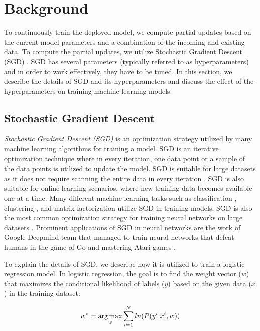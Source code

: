 \section{Background} \label{background}
To continuously train the deployed model, we compute partial updates based on the current model parameters and a combination of the incoming and existing data.
To compute the partial updates, we utilize Stochastic Gradient Descent (SGD) \cite{zhang2004solving}.
SGD has several parameters (typically referred to as hyperparameters) and in order to work effectively, they have to be tuned.
In this section, we describe the details of SGD and its hyperparameters and discuss the effect of the hyperparameters on training machine learning models.

\subsection{Stochastic Gradient Descent} \label{sgd}
\textit{Stochastic Gradient Descent (SGD)} is an optimization strategy utilized by many machine learning algorithms for training a model.
SGD is an iterative optimization technique where in every iteration, one data point or a sample of the data points is utilized to update the model.
SGD is suitable for large datasets as it does not require scanning the entire data in every iteration \cite{bottou2010large}.
SGD is also suitable for online learning scenarios, where new training data becomes available one at a time.
Many different machine learning tasks such as classification \cite{zhang2004solving, macmahan2013}, clustering \cite{bottou1995convergence}, and matrix factorization \cite{koren2009matrix,  funk2006netflix} utilize SGD in training models.
SGD is also the most common optimization strategy for training neural networks on large datasets \cite{dean2012large}.
Prominent applications of SGD in neural networks are the work of Google Deepmind team that managed to train neural networks that defeat humans in the game of Go \cite{silver2016mastering} and mastering Atari games \cite{mnih2013playing}.

To explain the details of SGD, we describe how it is utilized to train a logistic regression model.
In logistic regression, the goal is to find the weight vector ($w$) that maximizes the conditional likelihood of labels ($y$) based on the given data ($x$) in the training dataset:

\begin{equation}
w^* = \operatorname*{arg\,max}_w \sum_{i=1}^{N} ln(P(y^i | x^i, w))
\end{equation}

